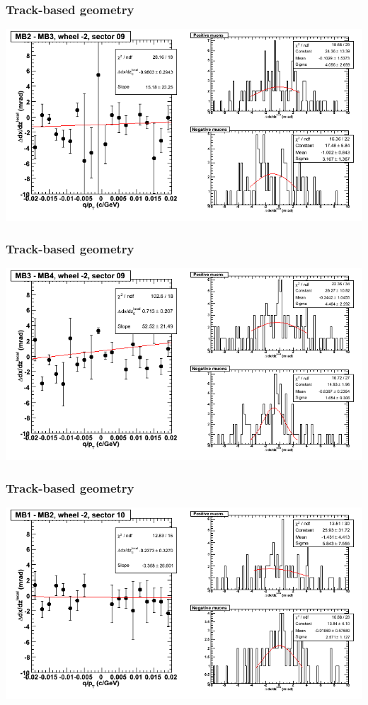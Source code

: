 \documentclass[compress]{beamer}
\begin{document}
\begin{frame}
\frametitle{Track-based geometry}
\includegraphics[width=\linewidth]{NOV4_segdiffs/dt13_slope_A_09_23.png}
\end{frame}

\begin{frame}
\frametitle{Track-based geometry}
\includegraphics[width=\linewidth]{NOV4_segdiffs/dt13_slope_A_09_34.png}
\end{frame}

\begin{frame}
\frametitle{Track-based geometry}
\includegraphics[width=\linewidth]{NOV4_segdiffs/dt13_slope_A_10_12.png}
\end{frame}
\end{document}
